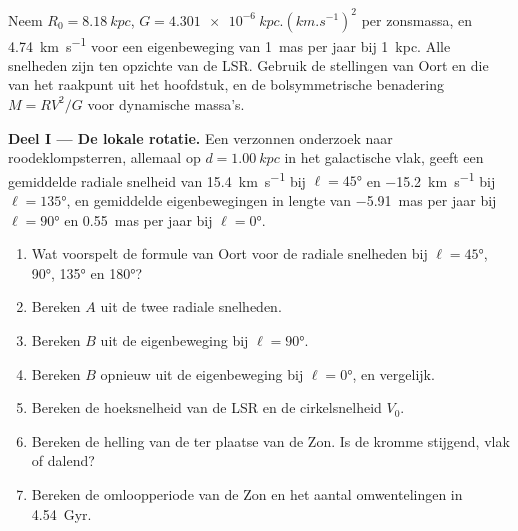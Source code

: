 \begin{problem}
\label{pb:b3:milky-way-galaxies:1}
Neem $R_0 = \qty{8.18}{kpc}$, $G = \qty{4.301e-6}{kpc.(km.s^{-1})^2}$ per
zonsmassa, en \qty{4.74}{km.s^{-1}} voor een eigenbeweging van
\qty{1}{mas} per jaar bij \qty{1}{kpc}. Alle snelheden zijn ten opzichte van de
LSR. Gebruik de stellingen van Oort en die van het raakpunt uit het hoofdstuk, en de
bolsymmetrische benadering $M = RV^2/G$ voor dynamische massa's.

\medskip\noindent\textbf{Deel I --- De lokale rotatie.} Een verzonnen
onderzoek naar roodeklompsterren, allemaal op $d = \qty{1.00}{kpc}$ in het galactische
vlak, geeft een gemiddelde radiale snelheid van \qty{+15.4}{km.s^{-1}} bij
$\ell = \ang{45}$ en \qty{-15.2}{km.s^{-1}} bij $\ell = \ang{135}$, en
gemiddelde eigenbewegingen in lengte van \qty{-5.91}{mas} per jaar bij
$\ell = \ang{90}$ en \qty{+0.55}{mas} per jaar bij $\ell = \ang{0}$.
\begin{enumerate}
\item Wat voorspelt de formule van Oort voor de radiale snelheden bij
  $\ell = \ang{45}$, \ang{90}, \ang{135} en \ang{180}?
\item Bereken $A$ uit de twee radiale snelheden.
\item Bereken $B$ uit de eigenbeweging bij $\ell = \ang{90}$.
\item Bereken $B$ opnieuw uit de eigenbeweging bij $\ell = \ang{0}$, en
  vergelijk.
\item Bereken de hoeksnelheid van de LSR en de cirkelsnelheid
  $V_0$.
\item Bereken de helling van de  ter plaatse van de Zon. Is de kromme
  stijgend, vlak of dalend?
\item Bereken de omloopperiode van de Zon en het aantal omwentelingen in
  \qty{4.54}{Gyr}.
\end{enumerate}


\end{problem}
